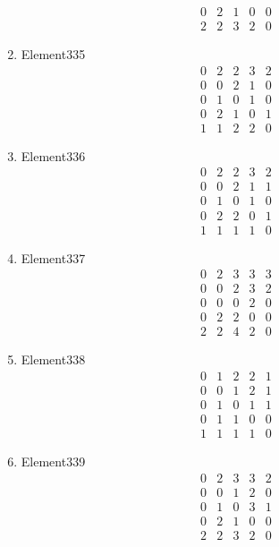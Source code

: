 \documentclass[12pt]{article}
\begin{document}
\begin{multicols}{3}
\begin{enumerate}
\begin{equation*}
\begin{array}{ccccc}
0&2&1&0&0\\
2&2&3&2&0
\end{array}
\end{equation*}
\item Element335
\begin{equation*}
\begin{array}{ccccc}
0&2&2&3&2\\
0&0&2&1&0\\
0&1&0&1&0\\
0&2&1&0&1\\
1&1&2&2&0
\end{array}
\end{equation*}
\item Element336
\begin{equation*}
\begin{array}{ccccc}
0&2&2&3&2\\
0&0&2&1&1\\
0&1&0&1&0\\
0&2&2&0&1\\
1&1&1&1&0
\end{array}
\end{equation*}
\item Element337
\begin{equation*}
\begin{array}{ccccc}
0&2&3&3&3\\
0&0&2&3&2\\
0&0&0&2&0\\
0&2&2&0&0\\
2&2&4&2&0
\end{array}
\end{equation*}
\item Element338
\begin{equation*}
\begin{array}{ccccc}
0&1&2&2&1\\
0&0&1&2&1\\
0&1&0&1&1\\
0&1&1&0&0\\
1&1&1&1&0
\end{array}
\end{equation*}
\item Element339
\begin{equation*}
\begin{array}{ccccc}
0&2&3&3&2\\
0&0&1&2&0\\
0&1&0&3&1\\
0&2&1&0&0\\
2&2&3&2&0
\end{array}

\end{equation*}
\end{enumerate}
\end{multicols}
\end{document}
